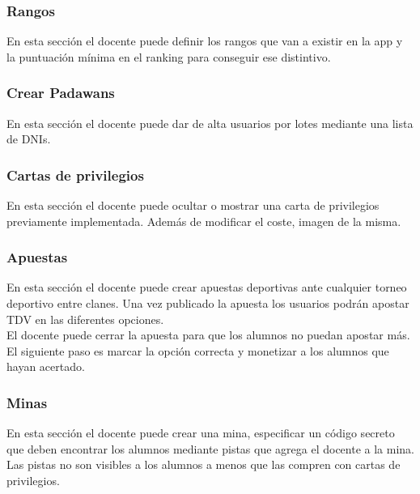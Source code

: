 \subsubsection{Rangos}
En esta sección el docente puede definir los rangos que van a existir en la app y la puntuación mínima en el ranking para conseguir ese distintivo.

\subsubsection{Crear Padawans}
En esta sección el docente puede dar de alta usuarios por lotes mediante una lista de DNIs.

\subsubsection{Cartas de privilegios}
En esta sección el docente puede ocultar o mostrar una carta de privilegios previamente implementada. Además de modificar el coste, imagen de la misma.

\subsubsection{Apuestas}
En esta sección el docente puede crear apuestas deportivas ante cualquier torneo deportivo entre clanes. Una vez publicado la apuesta los usuarios podrán apostar TDV en las diferentes opciones.\\

El docente puede cerrar la apuesta para que los alumnos no puedan apostar más. El siguiente paso es marcar la opción correcta y monetizar a los alumnos que hayan acertado.

\subsubsection{Minas}
En esta sección el docente puede crear una mina, especificar un código secreto que deben encontrar los alumnos mediante pistas que agrega el docente a la mina. Las pistas no son visibles a los alumnos a menos que las compren con cartas de privilegios.

\newpage

